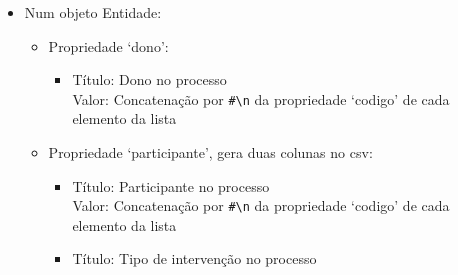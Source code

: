 \begin{itemize}
\begin{itemize}
\begin{itemize}
\begin{itemize}
                \item Título: Tipo de relação entre processos \\
                      Valor: Concatenação por \verb|#\n| da propriedade `idRel' de cada elemento da lista
            \end{itemize}
            \item Propriedade `legislacao', gera duas colunas no \acrshort{csv}:
            \begin{itemize}
                \item Título: Diplomas jurídico-administrativos REF Ids \\
                      Valor: Concatenação por \verb|#\n| da propriedade `idLeg' de cada elemento da lista
                \item Título: Diplomas jurídico-administrativos REF Títulos \\
                      Valor: Cada elemento da lista é mapeado para a concatenação da propriedade `tipo' com a propriedade `numero' com um espaço entre as duas propriedades; Concatenação por \verb|#\n| do mapeamento de cada elemento da lista
            \end{itemize}
            \item Propriedade `filhos': cada elemento deve ser convertido como se tratasse de um objeto classe; Deve ser ignorado os títulos gerados, mantendo apenas os valores numa nova linha do \acrshort{csv}
        \end{itemize}
        \item Num objeto Entidade:
        \begin{itemize}
            \item Propriedade `dono':
            \begin{itemize}
                \item Título: Dono no processo \\
                      Valor: Concatenação por \verb|#\n| da propriedade `codigo' de cada elemento da lista
            \end{itemize}
            \item Propriedade `participante', gera duas colunas no \acrshort{csv}:
            \begin{itemize}
                \item Título: Participante no processo \\
                      Valor: Concatenação por \verb|#\n| da propriedade `codigo' de cada elemento da lista
                \item Título: Tipo de intervenção no processo \\

\end{itemize}
\end{itemize}
\end{itemize}
\end{itemize}
